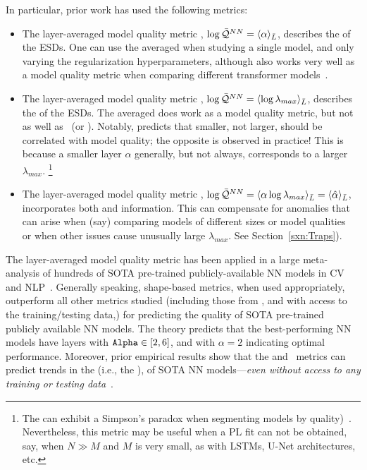 In particular, prior work has used the following metrics:
\begin{itemize}
\item
The layer-averaged model quality metric \ALPHA, $\log\bar{\mathcal{Q}}^{NN}=\langle\alpha\rangle_{\bar{L}}$, describes the \SHAPE of the ESDs.
One can use the averaged \ALPHA when studying a single model, and only varying the regularization hyperparameters, although \ALPHA also works very well as a model quality metric when comparing different transformer models~\cite{YHTx21_TR}.
\item
The layer-averaged model quality metric \LOGSPECTRALNORM, $\log\bar{\mathcal{Q}}^{NN}=\langle\log\lambda_{max}\rangle_{\bar{L}}$, describes the \SCALE of the ESDs.
The averaged \LOGSPECTRALNORM does work as a model quality metric, but not as well as \ALPHA~(or \ALPHAHAT).
Notably, \SLT predicts that smaller, not larger, \LOGSPECTRALNORM should be correlated with model quality; the opposite is observed in practice!
This is because a smaller layer $\alpha$ generally, but not always, corresponds to a larger $\lambda_{max}$.%
\footnote{The \LOGSPECTRALNORM can exhibit a Simpson's paradox when segmenting models by quality)~\cite{MM21a_simpsons_TR}.  Nevertheless, this metric may be useful when a PL fit can not be obtained, say, when $N\gg M$ and $M$ is very small, as with LSTMs,  U-Net architectures, etc.}
\item
The layer-averaged model quality metric \ALPHAHAT, $\log\bar{\mathcal{Q}}^{NN}=\langle\alpha\log\lambda_{max}\rangle_{\bar{L}}=\langle\hat{\alpha}\rangle_{\bar{L}}$, incorporates both \SHAPE and \SCALE information.
This can compensate for anomalies that can arise when (say) comparing models of different sizes or model qualities~\cite{MM21a_simpsons_TR} or when other issues cause unusually large $\lambda_{max}$. See Section~\ref{sxn:Traps}).
\end{itemize}

\noindent
The layer-averaged \ALPHAHAT model quality metric has been applied in a large meta-analysis of hundreds of SOTA 
pre-trained publicly-available NN models in CV and NLP~\cite{MM20a_trends_NatComm,YTHx22_TR,YTHx23_KDD,MM19a_TR}. 
%
Generally speaking, \HTSR shape-based metrics, when used appropriately, outperform all other metrics studied (including 
those from \SLT, and with access to the training/testing data,) for predicting the quality of SOTA pre-trained publicly available NN models.  
%
The \HTSR theory predicts that the best-performing NN models have layers with $\texttt{Alpha}\in[2,6]$, and with $\alpha=2$
indicating optimal performance.
Moreover, prior empirical results show that the \ALPHA and \ALPHAHAT~metrics can predict trends in the \Quality 
(i.e., the \GeneralizationAccuracy), of SOTA NN models---\emph{even without access to any training or testing data}~\cite{MM20a_trends_NatComm}.



